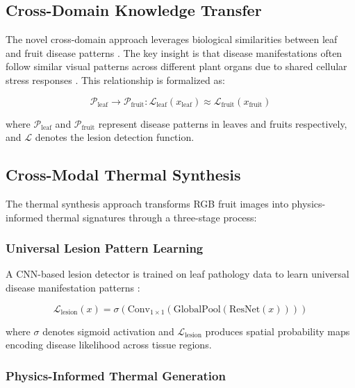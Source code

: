 \documentclass[conference]{IEEEtran}
\begin{document}
\subsection{Cross-Domain Knowledge Transfer}

The novel cross-domain approach leverages biological similarities between leaf and fruit disease patterns \cite{wang2019}. The key insight is that disease manifestations often follow similar visual patterns across different plant organs due to shared cellular stress responses \cite{chen2020}. This relationship is formalized as:

\begin{equation}
    \mathcal{P}_{\text{leaf}} \rightarrow \mathcal{P}_{\text{fruit}} : \mathcal{L}_{\text{leaf}}(x_{\text{leaf}}) \approx \mathcal{L}_{\text{fruit}}(x_{\text{fruit}})
    \label{eq:cross_domain}
\end{equation}

where $\mathcal{P}_{\text{leaf}}$ and $\mathcal{P}_{\text{fruit}}$ represent disease patterns in leaves and fruits respectively, and $\mathcal{L}$ denotes the lesion detection function.

\subsection{Cross-Modal Thermal Synthesis}

The thermal synthesis approach transforms RGB fruit images into physics-informed thermal signatures through a three-stage process:

\subsubsection{Universal Lesion Pattern Learning}

A CNN-based lesion detector is trained on leaf pathology data to learn universal disease manifestation patterns \cite{he2020}:

\begin{equation}
    \mathcal{L}_{\text{lesion}}(x) = \sigma(\text{Conv}_{1\times 1}(\text{GlobalPool}(\text{ResNet}(x))))
    \label{eq:lesion_detector}
\end{equation}

where $\sigma$ denotes sigmoid activation and $\mathcal{L}_{\text{lesion}}$ produces spatial probability maps encoding disease likelihood across tissue regions.

\subsubsection{Physics-Informed Thermal Generation}
\end{document}
